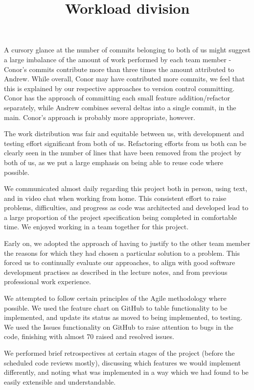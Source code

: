 \documentclass[a4paper, 11pt]{article}
\title{Workload division}
\begin{document}
\maketitle

A cursory glance at the number of commits belonging to both of us might suggest a large imbalance of the amount of work performed by each team member - Conor's commits contribute more than three times the amount attributed to Andrew. While overall, Conor may have contributed more commits, we feel that this is explained by our respective approaches to version control committing. Conor has the approach of committing each small feature addition/refactor separately, while Andrew combines several deltas into a single commit, in the main. Conor's approach is probably more appropriate, however.

The work distribution was fair and equitable between us, with development and testing effort significant from both of us. Refactoring efforts from us both can be clearly seen in the number of lines that have been removed from the project by both of us, as we put a large emphasis on being able to reuse code where possible.

We communicated almost daily regarding this project both in person, using text, and in video chat when working from home. This consistent effort to raise problems, difficulties, and progress as code was architected and developed lead to a large proportion of the project specification being completed in comfortable time. We enjoyed working in a team together for this project. 

Early on, we adopted the approach of having to justify to the other team member the reasons for which they had chosen a particular solution to a problem. This forced us to continually evaluate our approaches, to align with good software development practises as described in the lecture notes, and from previous professional work experience.

We attempted to follow certain principles of the Agile methodology where possible. We used the feature chart on GitHub to table functionality to be implemented, and update its status as moved to being implemented, to testing. We used the Issues functionality on GitHub to raise attention to bugs in the code, finishing with almost 70 raised and resolved issues. 

We performed brief retrospectives at certain stages of the project (before the scheduled code reviews mostly), discussing which features we would implement differently, and noting what was implemented in a way which we had found to be easily extensible and understandable.
	
\end{document}

